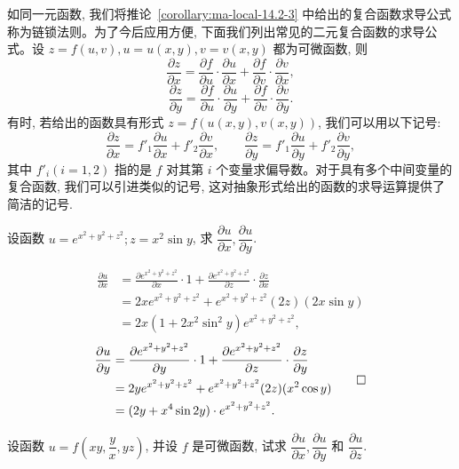 如同一元函数, 我们将推论~\ref{corollary:ma-local-14.2-3} 中给出的复合函数求导公式称为链锁法则。为了今后应用方便, 下面我们列出常见的二元复合函数的求导公式。设 $z=f(u,v), u=u(x,y), v=v(x,y)$ 都为可微函数, 则
\[
  \frac{\partial z}{\partial x}
  =\frac{\partial f}{\partial u}\cdot\frac{\partial u}{\partial x}
  +\frac{\partial f}{\partial v}\cdot\frac{\partial v}{\partial x},
\]
\[
  \frac{\partial z}{\partial y}
  =\frac{\partial f}{\partial u}\cdot\frac{\partial u}{\partial y}
  +\frac{\partial f}{\partial v}\cdot\frac{\partial v}{\partial y}.
\]
有时, 若给出的函数具有形式 $z=f(u(x,y),v(x,y))$, 我们可以用以下记号:
\[
  \frac{\partial z}{\partial x}=f'_1\frac{\partial u}{\partial x}+f'_2\frac{\partial v}{\partial x},
  \qquad
  \frac{\partial z}{\partial y}=f'_1\frac{\partial u}{\partial y}+f'_2\frac{\partial v}{\partial y},
\]
其中 $f'_i(i=1,2)$ 指的是 $f$ 对其第 $i$ 个变量求偏导数。对于具有多个中间变量的复合函数, 我们可以引进类似的记号, 这对抽象形式给出的函数的求导运算提供了简洁的记号.

\begin{example}\label{example:ma-14-2-1}
设函数 $u=e^{x^2+y^2+z^2}; z=x^2\sin y$, 求 $\dfrac{\partial u}{\partial x}, \dfrac{\partial u}{\partial y}$.
\end{example}


\begin{solve}
\[
\begin{aligned}
  \frac{\partial u}{\partial x}
  &=\frac{\partial e^{x^2+y^2+z^2}}{\partial x}\cdot1
  +\frac{\partial e^{x^2+y^2+z^2}}{\partial z}\cdot\frac{\partial z}{\partial x}\\
  &=2xe^{x^2+y^2+z^2}+e^{x^2+y^2+z^2}(2z)(2x\sin y)\\
  &=2x(1+2x^2\sin^2 y)e^{x^2+y^2+z^2},
\end{aligned}
\]
\[
\begin{aligned}
  \frac{\partial u}{\partial y}
  &=\frac{\partial e^{x^2+y^2+z^2}}{\partial y}\cdot1
  +\frac{\partial e^{x^2+y^2+z^2}}{\partial z}\cdot\frac{\partial z}{\partial y}\\
  &=2ye^{x^2+y^2+z^2}+e^{x^2+y^2+z^2}(2z)(x^2\cos y)\\
  &=(2y+x^4\sin2y)\cdot e^{x^2+y^2+z^2}.
\end{aligned}
\qedhere
\]
\end{solve}


\begin{example}\label{example:ma-14-2-2}
设函数 $u=f\left(xy,\dfrac yx,yz\right)$, 并设 $f$ 是可微函数, 试求 $\dfrac{\partial u}{\partial x}, \dfrac{\partial u}{\partial y}$ 和 $\dfrac{\partial u}{\partial z}$.
\end{example}


